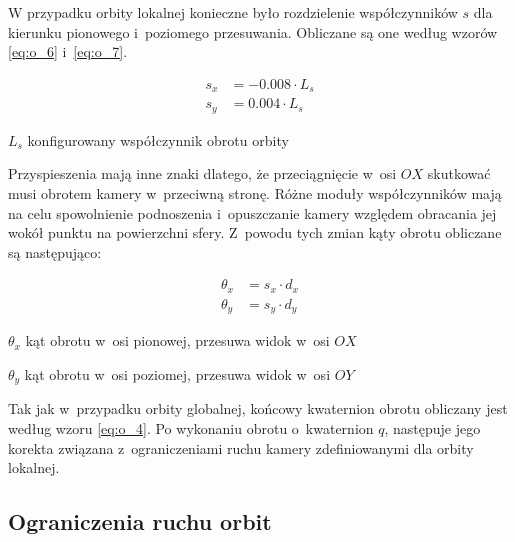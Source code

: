 W przypadku orbity lokalnej konieczne było rozdzielenie współczynników $s$ dla kierunku pionowego i~poziomego przesuwania. Obliczane są one według wzorów \ref{eq:o_6} i~\ref{eq:o_7}.

\begin{samepage}
    \begin{align}
        \label{eq:o_6}
        s_x &= -0.008 \cdot L_s \\
        \label{eq:o_7}
        s_y &= 0.004 \cdot L_s
    \end{align}
    \begin{eqexpl}[25mm]
        \item {$L_s$} konfigurowany współczynnik obrotu orbity 
    \end{eqexpl}
    \vspace{\baselineskip}
\end{samepage}

Przyspieszenia mają inne znaki dlatego, że przeciągnięcie w~osi $OX$ skutkować musi obrotem kamery w~przeciwną stronę. Różne moduły współczynników mają na celu spowolnienie podnoszenia i~opuszczanie kamery względem obracania jej wokół punktu na powierzchni sfery. Z~powodu tych zmian kąty obrotu obliczane są następująco:
\begin{samepage}
    \begin{align}
        \label{eq:o_8}
        \theta_x &= s_x \cdot d_x \\
        \theta_y &= s_y \cdot d_y
    \end{align}
    \begin{eqexpl}[25mm]
        \item {$\theta_x$} kąt obrotu w~osi pionowej, przesuwa widok w~osi $OX$
        \item {$\theta_y$} kąt obrotu w~osi poziomej, przesuwa widok w~osi $OY$
    \end{eqexpl}
    \vspace{\baselineskip}
\end{samepage}

Tak jak w~przypadku orbity globalnej, końcowy kwaternion obrotu obliczany jest według wzoru \ref{eq:o_4}. Po wykonaniu obrotu o~kwaternion $q$, następuje jego korekta związana z~ograniczeniami ruchu kamery zdefiniowanymi dla orbity lokalnej.

\subsection{Ograniczenia ruchu orbit}

